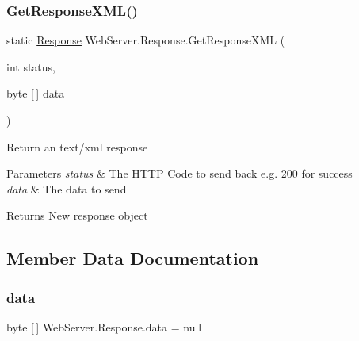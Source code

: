 \subsubsection{\texorpdfstring{Get\+Response\+X\+M\+L()}{GetResponseXML()}}
{\footnotesize\ttfamily static \hyperlink{class_web_server_1_1_response}{Response} Web\+Server.\+Response.\+Get\+Response\+X\+ML (\begin{DoxyParamCaption}\item[{int}]{status,  }\item[{byte \mbox{[}$\,$\mbox{]}}]{data }\end{DoxyParamCaption})\hspace{0.3cm}{\ttfamily [static]}}



Return an text/xml response 


\begin{DoxyParams}{Parameters}
{\em status} & The H\+T\+TP Code to send back e.\+g. 200 for success\\
\hline
{\em data} & The data to send\\
\hline
\end{DoxyParams}
\begin{DoxyReturn}{Returns}
New response object
\end{DoxyReturn}


\subsection{Member Data Documentation}
\mbox{\label{class_web_server_1_1_response_aa1776556ba9d3b143497693375106ea1}} 
\subsubsection{\texorpdfstring{data}{data}}
{\footnotesize\ttfamily byte \mbox{[}$\,$\mbox{]} Web\+Server.\+Response.\+data = null}





\mbox{\label{class_web_server_1_1_response_a12b80a663fee3e25d797abd8bbcbaaef}} 
